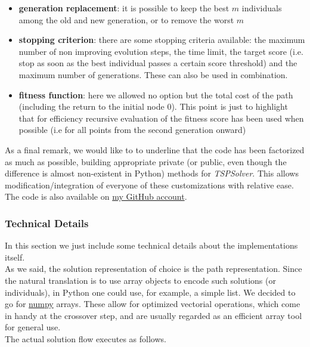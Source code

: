 \documentclass{article}
\begin{document}
\begin{itemize}
\item \textbf{generation replacement}: it is possible to keep the best $m$ individuals among the old and new generation, or to remove the worst $m$

\item \textbf{stopping criterion}: there are some stopping criteria available: the maximum number of non improving evolution steps, the time limit, the target score (i.e. stop as soon as the best individual passes a certain score threshold) and the maximum number of generations. These can also be used in combination.

\item \textbf{fitness function}: here we allowed no option but the total cost of the path (including the return to the initial node 0). This point is just to highlight that for efficiency recursive evaluation of the fitness score has been used when possible (i.e for all points from the second generation onward)
\end{itemize}
As a final remark, we would like to to underline that the code has been factorized as much as possible, building appropriate private (or public, even though the difference is almost non-existent in Python) methods for \textit{TSPSolver}. This allows modification/integration of everyone of these customizations with relative ease. The code is also available on \href{https://github.com/NRuggeriProjects/Combinatorial-Optimization}{my GitHub account}.


\subsubsection{Technical Details}
In this section we just include some technical details about the implementations itself. \\
As we said, the solution representation of choice is the path representation. Since the natural translation is to use array objects to encode such solutions (or individuals), in Python one could use, for example, a simple list. We decided to go for \href{https://www.numpy.org/}{numpy} arrays. These allow for optimized vectorial operations, which come in handy at the crossover step, and are usually regarded as an efficient array tool for general use. \\
The actual solution flow executes as follows. 
\end{document}
